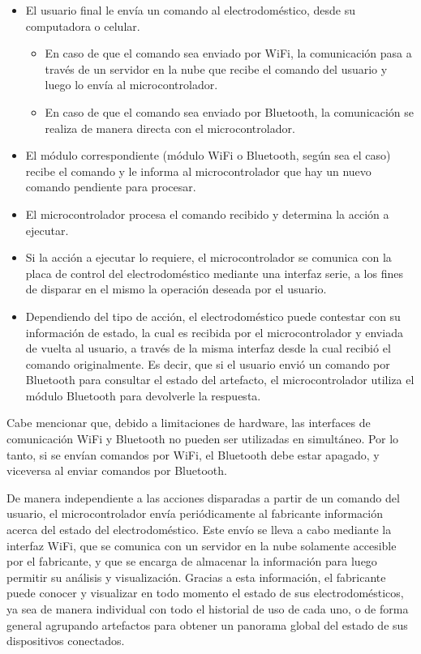\begin{itemize}
	\item El usuario final le envía un comando al electrodoméstico, desde su computadora o celular.
	\begin{itemize}
		\item En caso de que el comando sea enviado por WiFi, la comunicación pasa a través de un servidor en la nube que recibe el comando del usuario y luego lo envía al microcontrolador.
		\item En caso de que el comando sea enviado por Bluetooth, la comunicación se realiza de manera directa con el microcontrolador.
	\end{itemize}
	\item El módulo correspondiente (módulo WiFi o Bluetooth, según sea el caso) recibe el comando y le informa al microcontrolador que hay un nuevo comando pendiente para procesar.
	\item El microcontrolador procesa el comando recibido y determina la acción a ejecutar.
	\item Si la acción a ejecutar lo requiere, el microcontrolador se comunica con la placa de control del electrodoméstico mediante una interfaz serie, a los fines de disparar en el mismo la operación deseada por el usuario.
	\item Dependiendo del tipo de acción, el electrodoméstico puede contestar con su información de estado, la cual es recibida por el microcontrolador y enviada de vuelta al usuario, a través de la misma interfaz desde la cual recibió el comando originalmente. Es decir, que si el usuario envió un comando por Bluetooth para consultar el estado del artefacto, el microcontrolador utiliza el módulo Bluetooth para devolverle la respuesta.
\end{itemize}

Cabe mencionar que, debido a limitaciones de hardware, las interfaces de comunicación WiFi y Bluetooth no pueden ser utilizadas en simultáneo. Por lo tanto, si se envían comandos por WiFi, el Bluetooth debe estar apagado, y viceversa al enviar comandos por Bluetooth. 

De manera independiente a las acciones disparadas a partir de un comando del usuario, el microcontrolador envía periódicamente al fabricante información acerca del estado del electrodoméstico. Este envío se lleva a cabo mediante la interfaz WiFi, que se comunica con un servidor en la nube solamente accesible por el fabricante, y que se encarga de almacenar la información para luego permitir su análisis y visualización. Gracias a esta información, el fabricante puede conocer y visualizar en todo momento el estado de sus electrodomésticos, ya sea de manera individual con todo el historial de uso de cada uno, o de forma general agrupando artefactos para obtener un panorama global del estado de sus dispositivos conectados.

